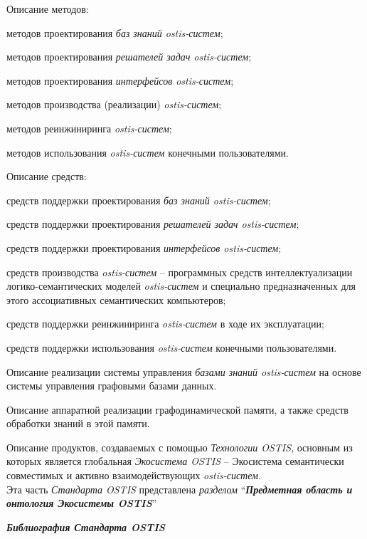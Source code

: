 \begin{SCn}
{\begin{scnitemize}
\begin{scnitemizeii}
			
				\item Описание методов:
				\begin{scnitemizeiii}
					\item методов проектирования \textit{баз знаний ostis-систем};
					\item методов проектирования \textit{решателей задач ostis-систем};
					\item методов проектирования \textit{интерфейсов ostis-систем};
					\item методов производства (реализации) \textit{ostis-систем};
					\item методов реинжиниринга \textit{ostis-систем};
					\item методов использования \textit{ostis-систем} конечными пользователями.
				\end{scnitemizeiii}
				\item Описание средств:
				\begin{scnitemizeiii}
					\item средств поддержки проектирования \textit{баз знаний ostis-систем};
					\item средств поддержки проектирования \textit{решателей задач ostis-систем};
					\item средств поддержки проектирования \textit{интерфейсов ostis-систем};
					\item средств производства \textit{ostis-систем} -- программных средств интеллектуализации логико-семантических моделей \textit{ostis-систем} и специально предназначенных для этого ассоциативных семантических компьютеров;
					\item средств поддержки реинжиниринга \textit{ostis-систем} в ходе их эксплуатации;
					\item средств поддержки использования \textit{ostis-систем} конечными пользователями.
				\end{scnitemizeiii}
				\item Описание реализации системы управления \textit{базами знаний ostis-систем} на основе системы управления графовыми базами данных.
				\item Описание аппаратной реализации графодинамической памяти, а также средств обработки знаний в этой памяти.
			\end{scnitemizeii}
			\item Описание продуктов, создаваемых с помощью \textit{Технологии OSTIS}, основным из которых является глобальная \textit{Экосистема OSTIS} -- Экосистема семантически совместимых и активно взаимодействующих \textit{ostis-систем}.\\
			Эта часть \textit{Стандарта OSTIS} представлена \textit{разделом} ``\textit{\textbf{Предметная область и онтология Экосистемы OSTIS}}''
			\item \textit{\textbf{Библиография Стандарта OSTIS}}
	\end{scnitemize}}
\end{SCn}
